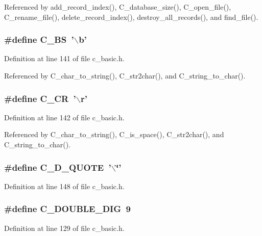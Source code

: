 Referenced by add\_\-record\_\-index(), C\_\-database\_\-size(), C\_\-open\_\-file(), C\_\-rename\_\-file(), delete\_\-record\_\-index(), destroy\_\-all\_\-records(), and find\_\-file().
\subsubsection{\setlength{\rightskip}{0pt plus 5cm}\#define C\_\-BS~'$\backslash$b'}\label{c__basic_8h_d9e0e09c2ece0beb24debbd31bd264b8}




Definition at line 141 of file c\_\-basic.h.

Referenced by C\_\-char\_\-to\_\-string(), C\_\-str2char(), and C\_\-string\_\-to\_\-char().
\subsubsection{\setlength{\rightskip}{0pt plus 5cm}\#define C\_\-CR~'$\backslash$r'}\label{c__basic_8h_cd89805bef1a49e9991ab2d3a586ed5c}




Definition at line 142 of file c\_\-basic.h.

Referenced by C\_\-char\_\-to\_\-string(), C\_\-is\_\-space(), C\_\-str2char(), and C\_\-string\_\-to\_\-char().
\subsubsection{\setlength{\rightskip}{0pt plus 5cm}\#define C\_\-D\_\-QUOTE~'$\backslash$\char`\"{}'}\label{c__basic_8h_1f1b11beb6b18ec6a02c91685dc39dc6}




Definition at line 148 of file c\_\-basic.h.
\subsubsection{\setlength{\rightskip}{0pt plus 5cm}\#define C\_\-DOUBLE\_\-DIG~9}\label{c__basic_8h_970a2c394377a3e49cf847a3db8d23ae}




Definition at line 129 of file c\_\-basic.h.
